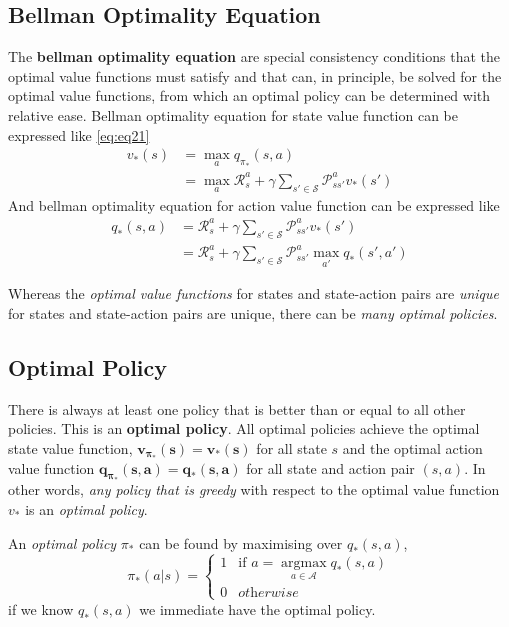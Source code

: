 \documentclass[
	10pt, %
]{article}
\newcommand{\mc}[1]{\mathcal{#1}}
\newcommand{\tb}[1]{\textbf{#1}}
\newcommand{\ti}[1]{\textit{#1}}
\numberwithin{equation}{subsection} %
\newcommand{\argmax}{\mathop{\mathrm{argmax}}\limits}
\begin{document}
\subsection{Bellman Optimality Equation}
The \tb{bellman optimality equation} are special consistency conditions that the optimal value functions must satisfy and that can, in principle, be solved for the optimal value functions, from which an optimal policy can be determined with relative ease. Bellman optimality equation for state value function can be expressed like \cref{eq:eq21}
\begin{equation} \label{eq:eq21}
    \begin{aligned}
        v_*(s) &= \max_{a}q_{\pi_*}(s,a)\\
        &=\max_a \mc{R}^a_{s} + \gamma \sum_{s' \in \mc{S}}\mc{P}^a_{ss'}v_*(s')
    \end{aligned}
\end{equation}
And bellman optimality equation for action value function can be expressed like \label{eq:eq22}
\begin{equation} \label{eq:eq22}
    \begin{aligned}
        q_*(s,a) &= \mc{R}^a_{s} + \gamma \sum_{s' \in \mc{S}} \mc{P}^a_{ss'}v_*(s') \\
        &= \mc{R}^a_{s} + \gamma \sum_{s' \in \mc{S}} \mc{P}^a_{ss'} \max_{a'} q_*(s',a')
    \end{aligned}
\end{equation}



Whereas the \ti{optimal value functions} for states and state-action pairs are \ti{unique} for states and state-action pairs are unique, there can be \ti{many optimal policies}.

\subsection{Optimal Policy}
There is always at least one policy that is better than or equal to all other policies. This is an \tb{optimal policy}. All optimal policies achieve the optimal state value function, $\bm{v_{\pi_*}(s) = v_*(s)}$ for all state $s$ and the optimal action value function $\bm{q_{\pi_*}(s,a) = q_*(s,a)}$ for all state and action pair $(s,a)$. In other words, \ti{any policy that is greedy} with respect to the optimal value function $v_*$ is an \ti{optimal policy}.

An \ti{optimal policy} $\pi_*$ can be found by maximising over $q_*(s,a)$,
\begin{equation}
    \pi_*(a|s) = 
    \begin{cases}
        1 & \text{if } a = \argmax_{a \in \mc{A}}q_*(s,a) \\
        0 & \ti{otherwise}
    \end{cases}
\end{equation}
if we know $q_*(s,a)$ we immediate have the optimal policy.
\newpage
\end{document}
